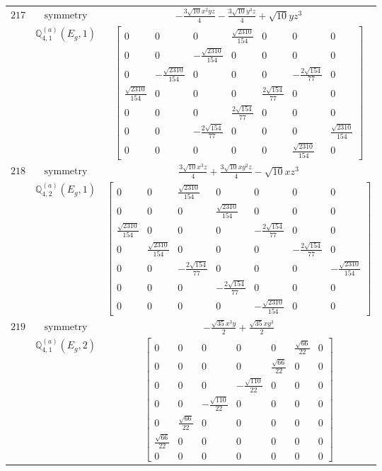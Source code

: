 \documentclass[fleqn,8pt,landscape]{jsarticle}
\begin{document}
\begin{longtable}{ccc}
$ 217 $ & $ \text{symmetry} $ & $ - \frac{3 \sqrt{10} x^{2} y z}{4} - \frac{3 \sqrt{10} y^{3} z}{4} + \sqrt{10} y z^{3} $ \\
$  $ & $ \mathbb{Q}_{4,1}^{(a)}(E_{g},1) $ & $ \begin{bmatrix} 0 & 0 & 0 & \frac{\sqrt{2310}}{154} & 0 & 0 & 0 \\ 0 & 0 & - \frac{\sqrt{2310}}{154} & 0 & 0 & 0 & 0 \\ 0 & - \frac{\sqrt{2310}}{154} & 0 & 0 & 0 & - \frac{2 \sqrt{154}}{77} & 0 \\ \frac{\sqrt{2310}}{154} & 0 & 0 & 0 & \frac{2 \sqrt{154}}{77} & 0 & 0 \\ 0 & 0 & 0 & \frac{2 \sqrt{154}}{77} & 0 & 0 & 0 \\ 0 & 0 & - \frac{2 \sqrt{154}}{77} & 0 & 0 & 0 & \frac{\sqrt{2310}}{154} \\ 0 & 0 & 0 & 0 & 0 & \frac{\sqrt{2310}}{154} & 0 \end{bmatrix} $ \\ \hline
$ 218 $ & $ \text{symmetry} $ & $ \frac{3 \sqrt{10} x^{3} z}{4} + \frac{3 \sqrt{10} x y^{2} z}{4} - \sqrt{10} x z^{3} $ \\
$  $ & $ \mathbb{Q}_{4,2}^{(a)}(E_{g},1) $ & $ \begin{bmatrix} 0 & 0 & \frac{\sqrt{2310}}{154} & 0 & 0 & 0 & 0 \\ 0 & 0 & 0 & \frac{\sqrt{2310}}{154} & 0 & 0 & 0 \\ \frac{\sqrt{2310}}{154} & 0 & 0 & 0 & - \frac{2 \sqrt{154}}{77} & 0 & 0 \\ 0 & \frac{\sqrt{2310}}{154} & 0 & 0 & 0 & - \frac{2 \sqrt{154}}{77} & 0 \\ 0 & 0 & - \frac{2 \sqrt{154}}{77} & 0 & 0 & 0 & - \frac{\sqrt{2310}}{154} \\ 0 & 0 & 0 & - \frac{2 \sqrt{154}}{77} & 0 & 0 & 0 \\ 0 & 0 & 0 & 0 & - \frac{\sqrt{2310}}{154} & 0 & 0 \end{bmatrix} $ \\ \hline
$ 219 $ & $ \text{symmetry} $ & $ - \frac{\sqrt{35} x^{3} y}{2} + \frac{\sqrt{35} x y^{3}}{2} $ \\
$  $ & $ \mathbb{Q}_{4,1}^{(a)}(E_{g},2) $ & $ \begin{bmatrix} 0 & 0 & 0 & 0 & 0 & \frac{\sqrt{66}}{22} & 0 \\ 0 & 0 & 0 & 0 & \frac{\sqrt{66}}{22} & 0 & 0 \\ 0 & 0 & 0 & - \frac{\sqrt{110}}{22} & 0 & 0 & 0 \\ 0 & 0 & - \frac{\sqrt{110}}{22} & 0 & 0 & 0 & 0 \\ 0 & \frac{\sqrt{66}}{22} & 0 & 0 & 0 & 0 & 0 \\ \frac{\sqrt{66}}{22} & 0 & 0 & 0 & 0 & 0 & 0 \\ 0 & 0 & 0 & 0 & 0 & 0 & 0 \end{bmatrix} $ \\ \hline

\end{longtable}
\end{document}
